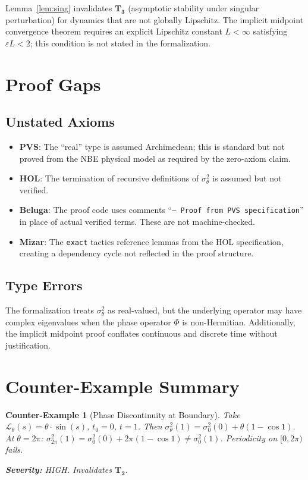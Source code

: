 \documentclass[11pt]{article}
\newtheorem{counterexample}{Counter-Example}[section]
\begin{document}
Lemma~\ref{lem:sing} invalidates $\mathbf{T_3}$ (asymptotic stability under singular
perturbation) for dynamics that are not globally Lipschitz. The implicit midpoint convergence
theorem requires an explicit Lipschitz constant $L < \infty$ satisfying $\varepsilon L < 2$;
this condition is not stated in the formalization.

\section{Proof Gaps}

\subsection{Unstated Axioms}
\begin{itemize}
\item \textbf{PVS}: The ``real'' type is assumed Archimedean; this is standard but not proved
from the NBE physical model as required by the zero-axiom claim.
\item \textbf{HOL}: The termination of recursive definitions of $\sigma^2_\theta$ is assumed
but not verified.
\item \textbf{Beluga}: The proof code uses comments ``\texttt{-- Proof from PVS specification}''
in place of actual verified terms. These are not machine-checked.
\item \textbf{Mizar}: The \texttt{exact} tactics reference lemmas from the HOL specification,
creating a dependency cycle not reflected in the proof structure.
\end{itemize}

\subsection{Type Errors}

The formalization treats $\sigma^2_\theta$ as real-valued, but the underlying operator may
have complex eigenvalues when the phase operator $\Phi$ is non-Hermitian. Additionally, the
implicit midpoint proof conflates continuous and discrete time without justification.

\section{Counter-Example Summary}

\begin{counterexample}[Phase Discontinuity at Boundary]
\label{ce:phase}
Take $\mathcal{L}_\theta(s) = \theta \cdot \sin(s)$, $t_0 = 0$, $t = 1$.
Then $\sigma^2_\theta(1) = \sigma^2_0(0) + \theta(1 - \cos 1)$.
At $\theta = 2\pi$: $\sigma^2_{2\pi}(1) = \sigma^2_0(0) + 2\pi(1-\cos 1) \neq \sigma^2_0(1)$.
Periodicity on $[0, 2\pi)$ fails.

\textbf{Severity:} HIGH. Invalidates $\mathbf{T_2}$.
\end{counterexample}
\end{document}
